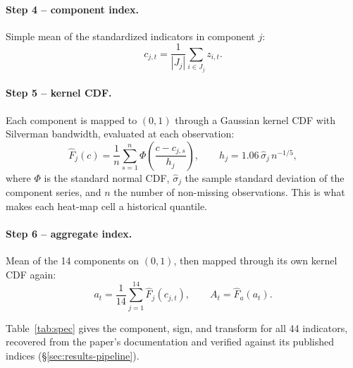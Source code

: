 \documentclass[11pt]{article}
\begin{document}
\paragraph{Step 4 -- component index.}
Simple mean of the standardized indicators in component $j$:
\begin{equation}
c_{j,t} = \frac{1}{|J_j|}\sum_{i \in J_j} z_{i,t}.
\end{equation}

\paragraph{Step 5 -- kernel CDF.}
Each component is mapped to $(0,1)$ through a Gaussian kernel CDF with
Silverman bandwidth, evaluated at each observation:
\begin{equation}
\hat{F}_j(c) = \frac{1}{n}\sum_{s=1}^{n}
\Phi\!\left(\frac{c-c_{j,s}}{h_j}\right), \qquad
h_j = 1.06\,\hat{\sigma}_j\, n^{-1/5},
\end{equation}
where $\Phi$ is the standard normal CDF, $\hat{\sigma}_j$ the sample
standard deviation of the component series, and $n$ the number of
non-missing observations.  This is what makes each heat-map cell a
historical quantile.

\paragraph{Step 6 -- aggregate index.}
Mean of the 14 components on $(0,1)$, then mapped through its own kernel
CDF again:
\begin{equation}
a_t = \frac{1}{14}\sum_{j=1}^{14}\hat{F}_j(c_{j,t}), \qquad
A_t = \hat{F}_a(a_t).
\end{equation}

Table~\ref{tab:spec} gives the component, sign, and transform for all 44
indicators, recovered from the paper's documentation and verified against
its published indices (\S\ref{sec:results-pipeline}).
\end{document}
